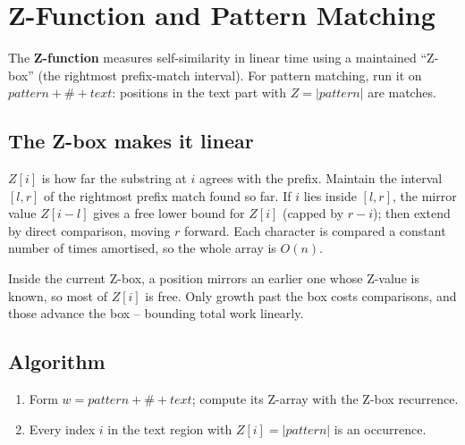 \section{Z-Function and Pattern Matching}
\label{sec:str-z-function}


\begin{patternbox}
The \textbf{Z-function} measures self-similarity in linear time using a
maintained ``Z-box'' (the rightmost prefix-match interval). For pattern
matching, run it on $\textit{pattern}+\#+\textit{text}$: positions in the
text part with $Z=|\textit{pattern}|$ are matches.
\end{patternbox}

\subsection*{The Z-box makes it linear}

$Z[i]$ is how far the substring at $i$ agrees with the prefix. Maintain the
interval $[l,r]$ of the rightmost prefix match found so far. If $i$ lies
inside $[l,r]$, the mirror value $Z[i-l]$ gives a free lower bound for
$Z[i]$ (capped by $r-i$); then extend by direct comparison, moving $r$
forward. Each character is compared a constant number of times amortised, so
the whole array is $O(n)$.

\begin{ideabox}
Inside the current Z-box, a position mirrors an earlier one whose Z-value is
known, so most of $Z[i]$ is free. Only growth past the box costs
comparisons, and those advance the box -- bounding total work linearly.
\end{ideabox}

\subsection*{Algorithm}

\begin{enumerate}
  \item Form $w=\textit{pattern}+\#+\textit{text}$; compute its Z-array
        with the Z-box recurrence.
  \item Every index $i$ in the text region with $Z[i]=|\textit{pattern}|$
        is an occurrence.
\end{enumerate}

